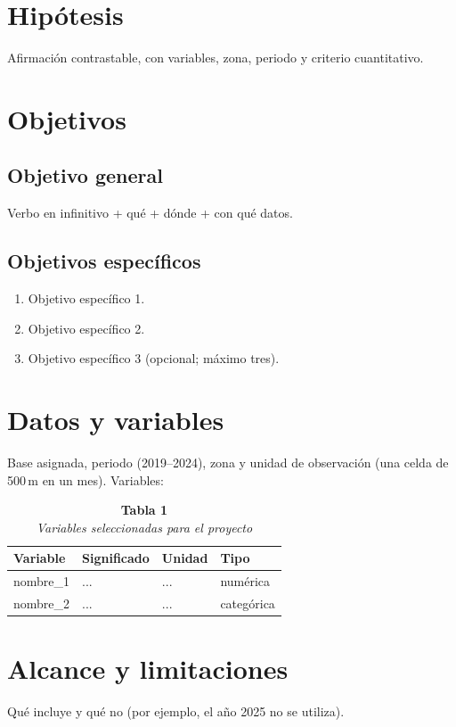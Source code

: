 \documentclass[12pt,a4paper]{article}
\begin{document}
\section{Hip\'otesis}
Afirmaci\'on contrastable, con variables, zona, periodo y criterio cuantitativo.

\section{Objetivos}
\subsection{Objetivo general}
Verbo en infinitivo + qu\'e + d\'onde + con qu\'e datos.

\subsection{Objetivos espec\'ificos}
\begin{enumerate}
  \item Objetivo espec\'ifico 1.
  \item Objetivo espec\'ifico 2.
  \item Objetivo espec\'ifico 3 (opcional; m\'aximo tres).
\end{enumerate}

\section{Datos y variables}
Base asignada, periodo (2019--2024), zona y unidad de observaci\'on (una celda de 500\,m en un mes). Variables:

\begin{table}[ht]
\centering
\singlespacing
\caption*{\textbf{Tabla 1}\\\textit{Variables seleccionadas para el proyecto}}
\begin{tabular}{llll}
\toprule
Variable & Significado & Unidad & Tipo \\
\midrule
nombre\_1 & ... & ... & num\'erica \\
nombre\_2 & ... & ... & categ\'orica \\
\bottomrule
\end{tabular}
\end{table}
\doublespacing

\section{Alcance y limitaciones}
Qu\'e incluye y qu\'e no (por ejemplo, el a\~no 2025 no se utiliza).
\end{document}
